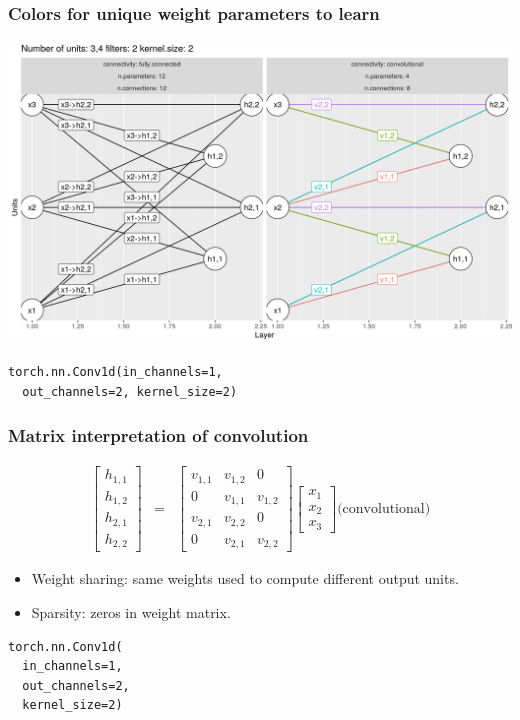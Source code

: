 \documentclass{beamer}
\begin{document}
\begin{frame}[fragile]
  \frametitle{Colors for unique weight parameters to learn}
  \includegraphics[width=\textwidth]{figure-convolutional-filters-3-2-2}
  
\begin{verbatim}
torch.nn.Conv1d(in_channels=1, 
  out_channels=2, kernel_size=2)
\end{verbatim}
\end{frame}

\begin{frame}[fragile]
  \frametitle{Matrix interpretation of convolution}
  \begin{eqnarray*}
  \begin{bmatrix}
    h_{1,1} \\
    h_{1,2} \\
    h_{2,1} \\
    h_{2,2}
  \end{bmatrix}
    &=&
  \begin{bmatrix}
    v_{1,1} & v_{1,2} & 0 \\
    0 & v_{1,1} & v_{1,2} \\
    v_{2,1} & v_{2,2} & 0 \\
    0 & v_{2,1} & v_{2,2}
  \end{bmatrix}
  \begin{bmatrix}
    x_1 \\
    x_2 \\
    x_3
  \end{bmatrix} \text{(convolutional)}
  \end{eqnarray*}
  \begin{itemize}
  \item Weight sharing: same weights used to compute different
    output units. 
  \item Sparsity: zeros in weight matrix.
  \end{itemize}

\begin{verbatim}
torch.nn.Conv1d(
  in_channels=1, 
  out_channels=2,
  kernel_size=2)
\end{verbatim}
  
\end{frame}
\end{document}
